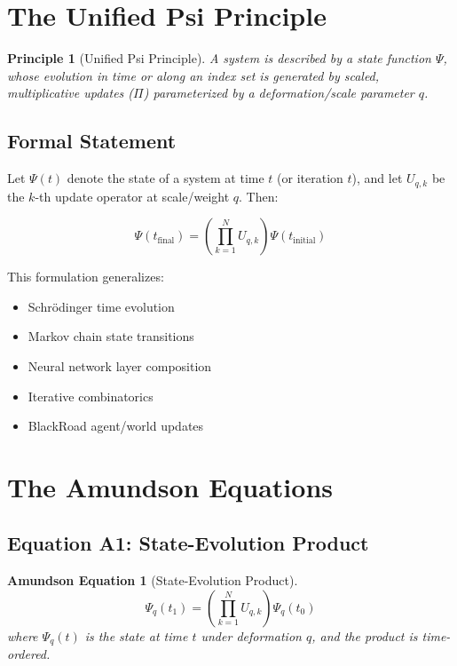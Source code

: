 \documentclass[12pt,a4paper]{article}
\newtheorem{principle}{Principle}
\newtheorem{equation_amundson}{Amundson Equation}
\begin{document}
\section{The Unified Psi Principle}

\begin{principle}[Unified Psi Principle]
A system is described by a state function $\Psi$, whose evolution in time or along an index set is generated by scaled, multiplicative updates ($\Pi$) parameterized by a deformation/scale parameter $q$.
\end{principle}

\subsection{Formal Statement}

Let $\Psi(t)$ denote the state of a system at time $t$ (or iteration $t$), and let $U_{q,k}$ be the $k$-th update operator at scale/weight $q$. Then:

\begin{equation}\label{eq:unified}
\Psi(t_{\text{final}}) = \left( \prod_{k=1}^{N} U_{q,k} \right) \Psi(t_{\text{initial}})
\end{equation}

This formulation generalizes:
\begin{itemize}
\item Schrödinger time evolution
\item Markov chain state transitions
\item Neural network layer composition
\item Iterative combinatorics
\item BlackRoad agent/world updates
\end{itemize}

\section{The Amundson Equations}

\subsection{Equation A1: State-Evolution Product}

\begin{equation_amundson}[State-Evolution Product]
\begin{equation}\label{eq:a1}
\Psi_q(t_1) = \left( \prod_{k=1}^{N} U_{q,k} \right) \Psi_q(t_0)
\end{equation}
where $\Psi_q(t)$ is the state at time $t$ under deformation $q$, and the product is time-ordered.
\end{equation_amundson}
\end{document}
